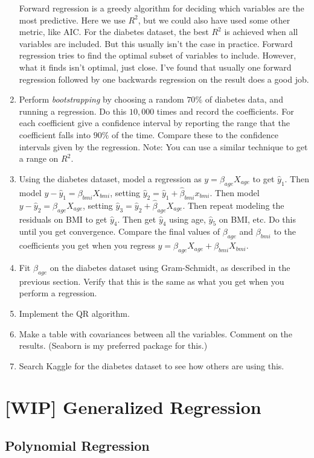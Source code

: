 \documentclass{amsbook}
\begin{document}
\begin{enumerate}
Forward regression is a greedy algorithm for deciding which variables are the most predictive.  Here we use $R^2$, but we could also have used some other metric, like AIC.  For the diabetes dataset, the best $R^2$ is achieved when all variables are included.  But this usually isn't the case in practice.  Forward regression tries to find the optimal subset of variables to include.  However, what it finds isn't optimal, just close.  I've found that usually one forward regression followed by one backwards regression on the result does a good job.
\item Perform {\em bootstrapping} by choosing a random $70\%$ of diabetes data, and running a regression.  Do this $10,000$ times and record the coefficients.  For each coefficient give a confidence interval by reporting the range that the coefficient falls into $90\%$ of the time.  Compare these to the confidence intervals given by the regression.  Note:  You can use a similar technique to get a range on $R^2$.
\item Using the diabetes dataset, model a regression as $y=\beta_{age}X_{age}$ to get $\hat y_1$.  Then model $y-\hat y_1=\beta_{bmi}X_{bmi}$, setting $\hat y_2=\hat y_1+\hat\beta_{bmi}x_{bmi}$.  Then model $y-\hat y_2=\beta_{age}X_{age}$, setting $\hat y_3=\hat y_2+\hat\beta_{age}X_{age}$.  Then repeat modeling the residuals on BMI to get $\hat y_4$.  Then get $\hat y_4$ using age, $\hat y_5$ on BMI, etc.  Do this until you get convergence.  Compare the final values of $\beta_{age}$ and $\beta_{bmi}$ to the coefficients you get when you regress $y=\beta_{age}X_{age}+\beta_{bmi}X_{bmi}$.
\item Fit $\beta_{age}$ on the diabetes dataset using Gram-Schmidt, as described in the previous section.  Verify that this is the same as what you get when you perform a regression.
\item Implement the QR algorithm.
\item Make a table with covariances between all the variables.  Comment on the results.  (Seaborn is my preferred package for this.)
\item Search Kaggle for the diabetes dataset to see how others are using this.
\end{enumerate}

\chapter{[WIP] Generalized Regression}
\section{Polynomial Regression}
\end{document}
